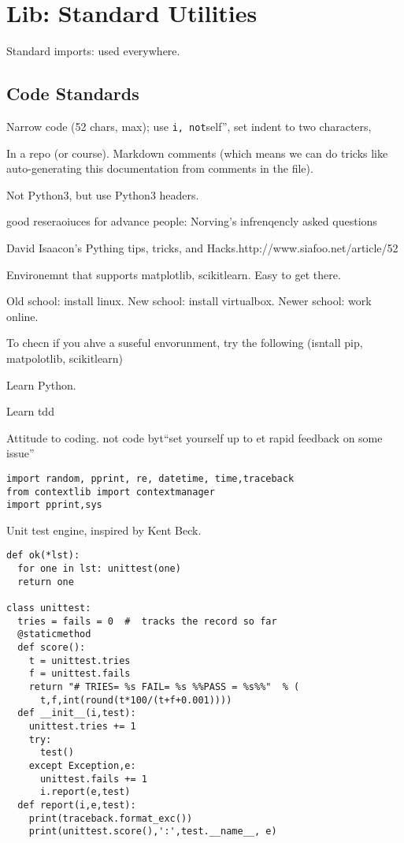 \section{Lib: Standard Utilities}\label{lib-standard-utilities}

Standard imports: used everywhere.

\subsection{Code Standards}\label{code-standards}

Narrow code (52 chars, max); use
\texttt{i\textquotesingle{}\textquotesingle{},\ not}self'', set indent
to two characters,

In a repo (or course). Markdown comments (which means we can do tricks
like auto-generating this documentation from comments in the file).

Not Python3, but use Python3 headers.

good reseraoiuces for advance people: Norving's infrenqencly asked
questions

David Isaacon's Pything tips, tricks, and
Hacks.http://www.siafoo.net/article/52

Environemnt that supports matplotlib, scikitlearn. Easy to get there.

Old school: install linux. New school: install virtualbox. Newer school:
work online.

To checn if you ahve a suseful envorunment, try the following (isntall
pip, matpolotlib, scikitlearn)

Learn Python.

Learn tdd

Attitude to coding. not code byt``set yourself up to et rapid feedback
on some issue''

\begin{lstlisting}
import random, pprint, re, datetime, time,traceback
from contextlib import contextmanager
import pprint,sys
\end{lstlisting}

Unit test engine, inspired by Kent Beck.

\begin{lstlisting}
def ok(*lst):
  for one in lst: unittest(one)
  return one

class unittest:
  tries = fails = 0  #  tracks the record so far
  @staticmethod
  def score():
    t = unittest.tries
    f = unittest.fails
    return "# TRIES= %s FAIL= %s %%PASS = %s%%"  % (
      t,f,int(round(t*100/(t+f+0.001))))
  def __init__(i,test):
    unittest.tries += 1
    try:
      test()
    except Exception,e:
      unittest.fails += 1
      i.report(e,test)
  def report(i,e,test):
    print(traceback.format_exc())
    print(unittest.score(),':',test.__name__, e)
\end{lstlisting}

